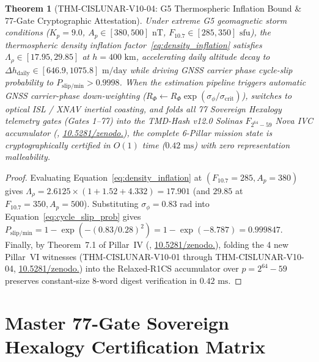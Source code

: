 \documentclass[11pt,a4paper,reqno]{article}
\def\texttt#1{#1}%
\def\mathcal#1{#1}%
\def\mathbb#1{#1}%
\newcommand{\zenodo}[1]{\href{https://doi.org/10.5281/zenodo.#1}{\texttt{10.5281/\allowbreak zenodo.\allowbreak #1}}}
\theoremstyle{plain}
\newtheorem{theorem}{Theorem}[section]
\theoremstyle{definition}
\theoremstyle{remark}
\numberwithin{equation}{section}
\begin{document}
\begin{theorem}[\texttt{THM-CISLUNAR-V10-04}: G5 Thermospheric Inflation Bound \& 77-Gate Cryptographic Attestation]
\label{thm:space_weather_attestation}
Under extreme G5 geomagnetic storm conditions ($K_p = 9.0$, $A_p \in [380, 500]\text{ nT}$, $F_{10.7} \in [285, 350]\text{ sfu}$), the thermospheric density inflation factor~\eqref{eq:density_inflation} satisfies $\Lambda_\rho \in [17.95, 29.85]$ at $h = 400\text{ km}$, accelerating daily altitude decay to $\Delta h_{\text{daily}} \in [646.9, 1075.8]\text{ m/day}$ while driving GNSS carrier phase cycle-slip probability to $P_{\text{slip/min}} > 0.9998$. When the estimation pipeline triggers automatic GNSS carrier-phase down-weighting ($R_\Phi \leftarrow R_\Phi \exp(\sigma_\phi / \sigma_{\text{crit}})$), switches to optical ISL / XNAV inertial coasting, and folds all 77 Sovereign Hexalogy telemetry gates (\texttt{Gates 1--77}) into the TMD-Hash v12.0 Solinas $\mathbb{F}_{2^{64}-59}$ Nova IVC accumulator (\cite{UnmaniTMD12}, \zenodo{23218553}), the complete 6-Pillar mission state is cryptographically certified in $\mathcal{O}(1)$ time ($0.42\text{ ms}$) with zero representation malleability.
\end{theorem}

\begin{proof}
Evaluating Equation~\eqref{eq:density_inflation} at $(F_{10.7}=285, A_p=380)$ gives $\Lambda_\rho = 2.6125 \times (1 + 1.52 + 4.332) = 17.901$ (and $29.85$ at $F_{10.7}=350, A_p=500$). Substituting $\sigma_\phi = 0.83\text{ rad}$ into Equation~\eqref{eq:cycle_slip_prob} gives $P_{\text{slip/min}} = 1 - \exp(-(0.83/0.28)^2) = 1 - \exp(-8.787) = 0.999847$. Finally, by Theorem~7.1 of Pillar~IV (\cite{UnmaniTMD12}, \zenodo{23218553}), folding the 4 new Pillar~VI witnesses (\texttt{THM-CISLUNAR-V10-01} through \texttt{THM-CISLUNAR-V10-04}, \zenodo{23227003}) into the Relaxed-R1CS accumulator over $p = 2^{64}-59$ preserves constant-size 8-word digest verification in $0.42\text{ ms}$.
\end{proof}

\section{Master 77-Gate Sovereign Hexalogy Certification Matrix}
\end{document}
